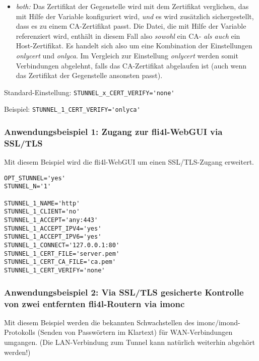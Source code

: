 \begin{description}
\begin{itemize}
\item \emph{both:} Das Zertifikat der Gegenstelle wird mit dem Zertifikat
verglichen, das mit Hilfe der Variable 
konfiguriert wird, \emph{und} es wird zusätzlich sichergestellt, dass es zu
einem CA-Zertifikat passt. Die Datei, die mit Hilfe der Variable
 referenziert wird, enthält in diesem Fall also
\emph{sowohl} ein CA- \emph{als auch} ein Host-Zertifikat. Es handelt sich also
um eine Kombination der Einstellungen \emph{onlycert} und \emph{onlyca}. Im
Vergleich zur Einstellung \emph{onlycert} werden somit Verbindungen abgelehnt,
falls das CA-Zertifikat abgelaufen ist (auch wenn das Zertifikat der
Gegenstelle ansonsten passt).

\end{itemize}

Standard-Einstellung: \verb+STUNNEL_x_CERT_VERIFY='none'+

Beispiel: \verb+STUNNEL_1_CERT_VERIFY='onlyca'+

\end{description}

\subsubsection{Anwendungsbeispiel 1: Zugang zur fli4l-WebGUI via SSL/TLS}

Mit diesem Beispiel wird die fli4l-WebGUI um einen SSL/TLS-Zugang erweitert.

\begin{example}
\begin{verbatim}
OPT_STUNNEL='yes'
STUNNEL_N='1'

STUNNEL_1_NAME='http'
STUNNEL_1_CLIENT='no'
STUNNEL_1_ACCEPT='any:443'
STUNNEL_1_ACCEPT_IPV4='yes'
STUNNEL_1_ACCEPT_IPV6='yes'
STUNNEL_1_CONNECT='127.0.0.1:80'
STUNNEL_1_CERT_FILE='server.pem'
STUNNEL_1_CERT_CA_FILE='ca.pem'
STUNNEL_1_CERT_VERIFY='none'
\end{verbatim}
\end{example}

\subsubsection{Anwendungsbeispiel 2: Via SSL/TLS gesicherte Kontrolle von zwei
entfernten fli4l-Routern via imonc}

Mit diesem Beispiel werden die bekannten Schwachstellen des
imonc/imond-Protokolls (Senden von Passwörtern im Klartext) für WAN-Verbindungen
umgangen. (Die LAN-Verbindung zum Tunnel kann natürlich weiterhin abgehört
werden!)

